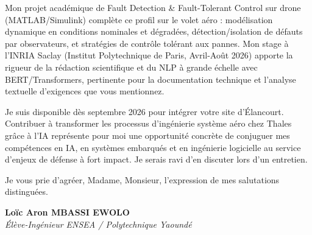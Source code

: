 \documentclass[a4paper,11pt]{article}
\begin{document}
Mon projet académique de Fault Detection \& Fault-Tolerant Control sur drone (MATLAB/Simulink) complète ce profil sur le volet aéro : modélisation dynamique en conditions nominales et dégradées, détection/isolation de défauts par observateurs, et stratégies de contrôle tolérant aux pannes. Mon stage à l'INRIA Saclay (Institut Polytechnique de Paris, Avril-Août 2026) apporte la rigueur de la rédaction scientifique et du NLP à grande échelle avec BERT/Transformers, pertinente pour la documentation technique et l'analyse textuelle d'exigences que vous mentionnez.

Je suis disponible dès septembre 2026 pour intégrer votre site d'Élancourt. Contribuer à transformer les processus d'ingénierie système aéro chez Thales grâce à l'IA représente pour moi une opportunité concrète de conjuguer mes compétences en IA, en systèmes embarqués et en ingénierie logicielle au service d'enjeux de défense à fort impact. Je serais ravi d'en discuter lors d'un entretien.

Je vous prie d'agréer, Madame, Monsieur, l'expression de mes salutations distinguées.

\vspace{0.8cm}

\textbf{Loïc Aron MBASSI EWOLO}\\
\textit{Élève-Ingénieur ENSEA / Polytechnique Yaoundé}
\end{document}
